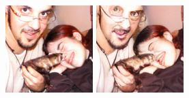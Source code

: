 \begin{figure}[h]
    \begin{minipage}{0.15\textwidth}
        \centering
        \includegraphics[width=\linewidth]{material/origin/281.png}
    \end{minipage}
    \begin{minipage}{0.15\textwidth}
        \centering
        \includegraphics[width=\linewidth]{material/vq/281.png}

\end{minipage}
\end{figure}
